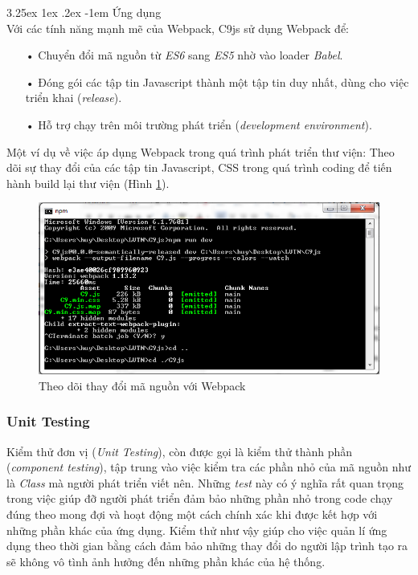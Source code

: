 \documentclass[12pt,a4paper]{article}
\makeatletter
\newcommand{\myparagraph}[1]{\paragraph{#1}\mbox{}\\} %
\renewcommand\paragraph{\@startsection{paragraph}{5}{\z@}%
  {3.25ex \@plus1ex \@minus.2ex}%
  {-1em}%
  {\normalfont\normalsize\bfseries}}
\makeatother
\begin{document}
\myparagraph{Ứng dụng}
Với các tính năng mạnh mẽ của Webpack, C9js sử dụng Webpack để:
\begin{itemize}
\item[•] Chuyển đổi mã nguồn từ \textit{ES6} sang \textit{ES5} nhờ vào loader \textit{Babel}.
\item[•] Đóng gói các tập tin Javascript thành một tập tin duy nhất, dùng cho việc triển khai (\textit{release}).
\item[•] Hỗ trợ chạy trên môi trường phát triển (\textit{development environment}).
\end{itemize}

Một ví dụ về việc áp dụng Webpack trong quá trình phát triển thư viện: Theo dõi sự thay đổi của các tập tin Javascript, CSS trong quá trình coding để tiến hành build lại thư viện (Hình \ref{fig:webpack_build}).

\begin{figure}[!h]
	\begin{center}
    \includegraphics[scale=.8]{image/webpack_build}
    \caption{Theo dõi thay đổi mã nguồn với Webpack}
    \label{fig:webpack_build}
	\end{center}
\end{figure}

\subsubsection{Unit Testing}
Kiểm thử đơn vị (\textit{Unit Testing}), còn được gọi là kiểm thử thành phần (\textit{component testing}), tập trung vào việc kiểm tra các phần nhỏ của mã nguồn như là \textit{Class} mà người phát triển viết nên. Những \textit{test} này có ý nghĩa rất quan trọng trong việc giúp đỡ người phát triển đảm bảo những phần nhỏ trong code chạy đúng theo mong đợi và hoạt động một cách chính xác khi được kết hợp với những phần khác của ứng dụng. Kiểm thử như vậy giúp cho việc quản lí ứng dụng theo thời gian bằng cách đảm bảo những thay đổi do người lập trình tạo ra sẽ không vô tình ảnh hưởng đến những phần khác của hệ thống.
\end{document}
